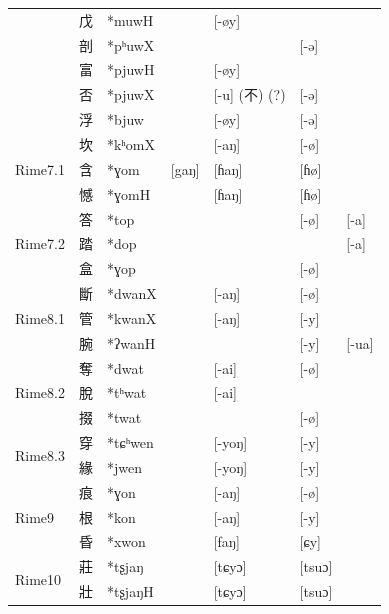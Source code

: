 \documentclass{scrbook}
\newcounter{c}[subsubsection]
\begin{document}
\begin{sloppypar}
\begin{landscape}
\begin{longtable}[htbp]{lllllll}
          & 戊     & *muwH &       & [-øy] &       &  \\
          & 剖     & *pʰuwX &       &       & [-ə]  &  \\
          & 富     & *pjuwH &       & [-øy] &       &  \\
          & 否     & *pjuwX &       & [-u] (不) (?) & [-ə]  &  \\
          & 浮     & *bjuw &       & [-øy] & [-ə]  &  \\
    \midrule
    \multirow{3}[2]{*}{Rime7.1} & 坎     & *kʰomX &       & [-aŋ] & [-ø]  &  \\
          & 含     & *ɣom  & \multicolumn{1}{l}{[gaŋ]} & [ɦaŋ] & [ɦø]  &  \\
          & 憾     & *ɣomH &       & [ɦaŋ] & [ɦø]  &  \\
    \midrule
    \multirow{3}[2]{*}{Rime7.2} & 答     & *top  &       &       & [-ø]  & \multicolumn{1}{l}{[-a]} \\
          & 踏     & *dop  &       &       &       & \multicolumn{1}{l}{[-a]} \\
          & 盒     & *ɣop  &       &       & [-ø]  &  \\          
    \midrule
    \multirow{3}[2]{*}{Rime8.1} & 斷     & *dwanX &       & [-aŋ] & [-ø]  &  \\
          & 管     & *kwanX &       & [-aŋ] & [-y]  &  \\
          & 腕     & *ʔwanH &       &       & [-y]  & \multicolumn{1}{l}{[-ua]} \\
    \midrule
    \multirow{3}[2]{*}{Rime8.2} & 奪     & *dwat &       & [-ai] & [-ø]  &  \\
          & 脫     & *tʰwat &       & [-ai] &       &  \\
          & 掇     & *twat &       &       & [-ø]  &  \\
    \midrule
    \multirow{2}[2]{*}{Rime8.3} & 穿     & *tɕʰwen &       & [-yoŋ] & [-y]  &  \\
          & 緣     & *jwen &       & [-yoŋ] & [-y]  &  \\
    \midrule
    \multirow{3}[2]{*}{Rime9} & 痕     & *ɣon  &       & [-aŋ] & [-ø]  &  \\
          & 根     & *kon  &       & [-aŋ] & [-y]  &  \\
          & 昏     & *xwon &       & [faŋ] & [ɕy]  &  \\
    \midrule
    \multirow{2}[2]{*}{Rime10} & 莊     & *tʂjaŋ &       & [tɕyɔ] & [tsuɔ] &  \\
          & 壯     & *tʂjaŋH &       & [tɕyɔ] & [tsuɔ] &  \\

\end{longtable}
\end{landscape}
\end{sloppypar}
\end{document}
